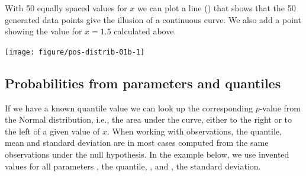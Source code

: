 \documentclass[krantz2]{krantz}\usepackage{knitr}
\begin{document}
With 50 equally spaced values for $x$ we can plot a line () that shows that the 50 generated data points give the illusion of a continuous curve. We also add a point showing the value for $x = 1.5$ calculated above.

\begin{knitrout}\footnotesize
{}\color{fgcolor}\begin{kframe}
\begin{alltt}
 \hlkwb{<-} \hlstd{(} \hlstd{=} \hlopt{-}\hlstd{,}  \hlstd{=} \hlstd{,}  \hlstd{=} \hlstd{)}

 \hlkwb{<-} \hlstd{(} 
                   \hlstd{=} \hlstd{(}   \hlstd{=} \hlstd{,}  \hlstd{=} \hlstd{))}
\hlopt{~}    \hlstd{=} \hlstd{)}
\hlstd{(} \hlstd{=} \hlstd{,}  \hlstd{=} \hlstd{(} \hlstd{=} \hlstd{,}  \hlstd{=} \hlstd{,}  \hlstd{=} \hlstd{))}
\end{alltt}
\end{kframe}

{\centering \texttt{[image: figure/pos-distrib-01b-1]} 

}


\end{knitrout}

\subsection{Probabilities from parameters and quantiles}\label{sec:prob:quant}

If we have a known quantile value we can look up the corresponding $p$-value from the Normal distribution, i.e., the area under the curve, either to the right or to the left of a given value of $x$. When working with observations, the quantile, mean and standard deviation are in most cases computed from the same observations under the null hypothesis. In the example below, we use invented values for all parameters , the quantile, , and , the standard deviation.
\end{document}

